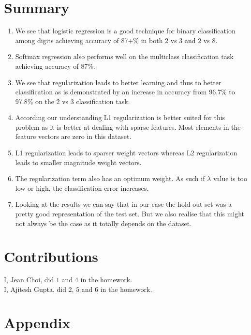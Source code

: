 \documentclass[11pt,twoside]{article}
\begin{document}
\section{Summary}
\begin{enumerate}[label=(\alph*)]
\item We see that logistic regression is a good technique for binary classification among digits achieving accuracy of 87+\% in both 2 vs 3 and 2 vs 8.
\item Softmax regression also performs well on the multiclass classification task achieving accuracy of 87\%.
\item We see that regularization leads to better learning and thus to better classification as is demonstrated by an increase in accuracy from 96.7\% to 97.8\% on the 2 vs 3 classification task.
\item According our understanding L1 regularization is better suited for this problem as it is better at dealing with sparse features. Most elements in the feature vectors are zero in this dataset.
\item L1 regularization leads to sparser weight vectors whereas L2 regularization leads to smaller magnitude weight vectors.
\item The regularization term also has an optimum weight. As such if $\lambda$ value is too low or high, the classification error increases.
\item Looking at the results we can say that in our case the hold-out set was a pretty good representation of the test set. But we also realise that this might not always be the case as it totally depends on the dataset.

\end{enumerate}

\section{Contributions}

I, Jean Choi, did $1$ and $4$ in the homework.\\
I, Ajitesh Gupta, did $2$, $5$ and $6$ in the homework.\\

\section*{Appendix}













\printbibliography
\end{document}
